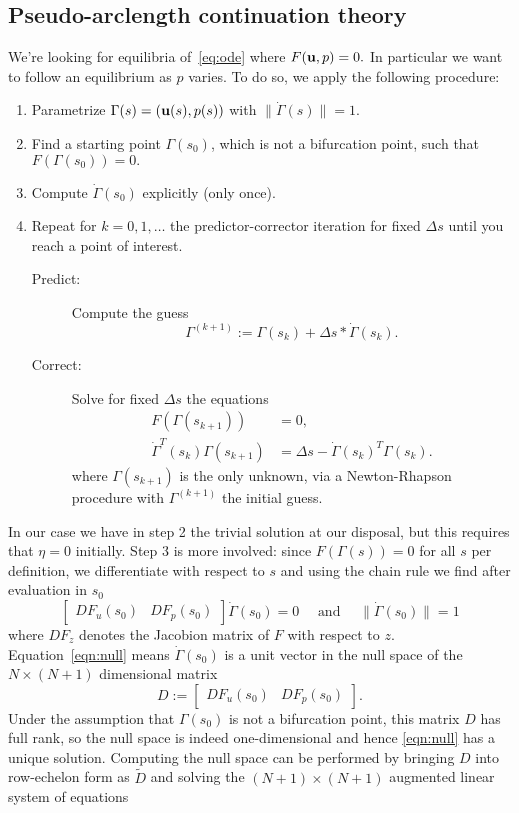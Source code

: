\subsection{Pseudo-arclength continuation theory}
We're looking for equilibria of~\eqref{eq:ode} where $F(\mathbf{u}, p) = 0.$ In particular we want to follow an equilibrium as $p$ varies. To do so, we apply the following procedure:
\begin{enumerate}
  \item Parametrize $\Gamma(s) = (\mathbf{u}(s), p(s))$ with $\|\dot\Gamma(s)\| = 1.$
  \item Find a starting point $\Gamma(s_0)$, which is not a bifurcation point, such that $F(\Gamma(s_0)) = 0.$ 
  \item Compute $\dot\Gamma(s_0)$ explicitly (only once).
  \item Repeat for $k = 0, 1, \dots$ the predictor-corrector iteration for fixed $\Delta s$ until you reach a point of interest.
  \begin{description}
    \item[Predict:] Compute the guess $$\Gamma^{(k+1)} := \Gamma(s_k) + \Delta s * \dot\Gamma(s_k).$$
    \item[Correct:] Solve for fixed $\Delta s$ the equations \begin{equation}\begin{aligned}\label{eq:hoi}
      F(\Gamma(s_{k+1})) &= 0, \\
      \dot\Gamma^T(s_k)\Gamma(s_{k+1}) &= \Delta s - \dot\Gamma(s_k)^T\Gamma(s_k).
    \end{aligned}
    \end{equation}
    where $\Gamma(s_{k+1})$ is the only unknown, via a Newton-Rhapson procedure with $\Gamma^{(k+1)}$ the initial guess.
  \end{description}
\end{enumerate}
In our case we have in step 2 the trivial solution at our disposal, but this requires that $\eta = 0$ initially. Step 3 is more involved: since $F(\Gamma(s)) = 0$ for all $s$ per definition, we differentiate with respect to $s$ and using the chain rule we find after evaluation in $s_0$
\begin{equation}\label{eqn:null}
  \begin{bmatrix}
    DF_u(s_0) & DF_p(s_0)
  \end{bmatrix}\Dot\Gamma(s_0)
  = 0 \quad \text{ and } \quad \|\dot\Gamma(s_0)\| = 1
\end{equation}
where $DF_z$ denotes the Jacobion matrix of $F$ with respect to $z.$ Equation~\eqref{eqn:null} means $\dot\Gamma(s_0)$ is a unit vector in the null space of the $N \times (N + 1)$ dimensional matrix $$D := \begin{bmatrix} DF_u(s_0) & DF_p(s_0) \end{bmatrix}.$$ Under the assumption that $\Gamma(s_0)$ is not a bifurcation point, this matrix $D$ has full rank, so the null space is indeed one-dimensional and hence \eqref{eqn:null} has a unique solution. Computing the null space can be performed by bringing $D$ into row-echelon form as $\tilde{D}$ and solving the $(N + 1) \times (N + 1)$ augmented linear system of equations
